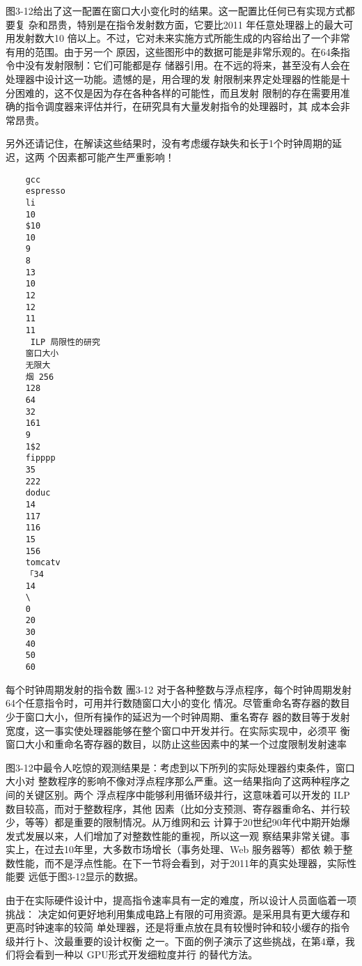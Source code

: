 图3-12给出了这一配置在窗口大小变化时的结果。这一配置比任何已有实现方式都要复
杂和昂贵，特别是在指令发射数方面，它要比2011 年任意处理器上的最大可用发射数大10
倍以上。不过，它对未来实施方式所能生成的内容给出了一个非常有用的范围。由于另一个
原因，这些图形中的数据可能是非常乐观的。在64条指令中没有发射限制：它们可能都是存
储器引用。在不远的将来，甚至没有人会在处理器中设计这一功能。遗憾的是，用合理的发
射限制来界定处理器的性能是十分困难的，这不仅是因为存在各种各样的可能性，而且发射
限制的存在需要用准确的指令调度器来评估并行，在研究具有大量发射指令的处理器时，其
成本会非常昂贵。

另外还请记住，在解读这些结果时，没有考虑缓存缺失和长于1个时钟周期的延迟，这两
个因素都可能产生严重影响！
\begin{verbatim}
    gcc
    espresso
    li
    10
    $10
    10
    9
    8
    13
    10
    12
    12
    11
    11
     ILP 局限性的研究
    窗口大小
    无限大
    烟 256
    128
    64
    32
    161
    9
    1$2
    fipppp
    35
    222
    doduc
    14
    117
    116
    15
    156
    tomcatv
    「34
    14
    \
    0
    20
    30
    40
    50
    60
\end{verbatim}
每个时钟周期发射的指令数
團3-12 对于各种整数与浮点程序，每个时钟周期发射64个任意指令时，可用并行数随窗口大小的变化
情况。尽管重命名寄存器的数目少于窗口大小，但所有操作的延迟为一个时钟周期、重名寄存
器的数目等于发射宽度，这一事实使处理器能够在整个窗口中开发并行。在实际实现中，必须平
衡窗口大小和重命名寄存器的数目，以防止这些因素中的某一个过度限制发射速率

图3-12中最令人吃惊的观测结果是：考虑到以下所列的实际处理器约束条件，窗口大小对
整数程序的影响不像对浮点程序那么严重。这一结果指向了这两种程序之间的关键区别。两个
浮点程序中能够利用循环级并行，这意味着可以开发的 ILP数目较高，而对于整数程序，其他
因素（比如分支预测、寄存器重命名、并行较少，等等）都是重要的限制情况。从万维网和云
计算于20世纪90年代中期开始爆发式发展以来，人们增加了对整数性能的重视，所以这一观
察结果非常关键。事实上，在过去10年里，大多数市场增长（事务处理、Web 服务器等）都依
赖于整数性能，而不是浮点性能。在下一节将会看到，对于2011年的真实处理器，实际性能要
远低于图3-12显示的数据。

由于在实际硬件设计中，提高指令速率具有一定的难度，所以设计人员面临着一项挑战：
决定如何更好地利用集成电路上有限的可用资源。是采用具有更大缓存和更高时钟速率的较简
单处理器，还是将重点放在具有较慢时钟和较小缓存的指令级并行卜、汶最重要的设计权衡
之一。下面的例子演示了这些挑战，在第4章，我们将会看到一种以 GPU形式开发细粒度并行
的替代方法。

